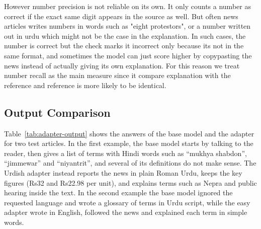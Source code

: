 \documentclass{FastFyp}
\begin{document}
However number precision is not reliable on its own. It only counts a number as correct if the exact same digit appears in the source as well. But often news articles writes numbers in words such as "eight protestors", or a number written out in urdu which might not be the case in the explanation. In such cases, the number is correct but the check marks it incorrect only because its not in the same format, and sometimes the model can just score higher by copypasting the news instead of actually giving its own explanation. For this reason we treat number recall as the main measure since it compare explanation with the reference and reference is more likely to be identical.

\subsection{Output Comparison}
Table~\ref{tab:adapter-output} shows the answers of the base model and the adapter for two test articles. In the first example, the base model starts by talking to the reader, then gives a list of terms with Hindi words such as ``mukhya shabdon'', ``jimmewar'' and ``niyantrit'', and several of its definitions do not make sense. The Urdish adapter instead reports the news in plain Roman Urdu, keeps the key figures (Rs32 and Rs22.98 per unit), and explains terms such as Nepra and public hearing inside the text. In the second example the base model ignored the requested language and wrote a glossary of terms in Urdu script, while the easy adapter wrote in English, followed the news and explained each term in simple words.
\end{document}
